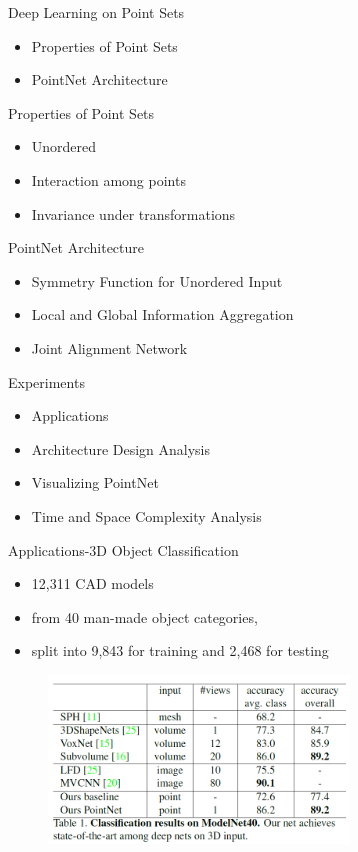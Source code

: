 \documentclass[serif,mathserif]{beamer}
\begin{document}
\begin{frame}{Deep Learning on Point Sets}
	\begin{itemize}
		\item Properties of Point Sets
		\item PointNet Architecture
	\end{itemize}
\end{frame}

\begin{frame}{Properties of Point Sets}
	\begin{itemize}
		\item Unordered
		\item Interaction among points
		\item Invariance under transformations
	\end{itemize}
\end{frame}

\begin{frame}{PointNet Architecture}
	\begin{itemize}
		\item Symmetry Function for Unordered Input
		\item Local and Global Information Aggregation
		\item Joint Alignment Network
	\end{itemize}
\end{frame}

\begin{frame}{Experiments}
	\begin{itemize}
		\item Applications
		\item Architecture Design Analysis
		\item Visualizing PointNet
		\item Time and Space Complexity Analysis
	\end{itemize}
\end{frame}

\begin{frame}{Applications-3D Object Classification}
	\begin{itemize}
		\item 12,311 CAD models
		\item from 40 man-made object categories, 
		\item split into 9,843 for training and 2,468 for testing
	\end{itemize}
	\begin{figure}
		\includegraphics[width=8cm]{image/application.png}
	\end{figure}
\end{frame}
\end{document}

